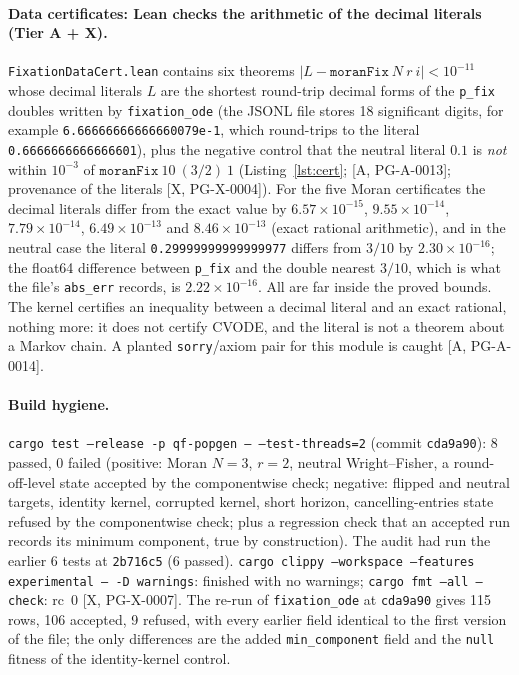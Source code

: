\documentclass[11pt]{article}
\theoremstyle{remark}
\newcommand{\tier}[1]{\textsf{[#1]}}
\newcommand{\lean}[1]{\texttt{#1}}
\begin{document}
\paragraph{Data certificates: Lean checks the arithmetic of the decimal literals (Tier A + X).} \lean{FixationDataCert.lean} contains six theorems
$|L-\texttt{moranFix}\ N\ r\ i|<10^{-11}$ whose decimal literals $L$ are the shortest round-trip decimal forms of the \texttt{p\_fix} doubles written by \lean{fixation\_ode} (the JSONL file stores 18 significant digits, for example \texttt{6.66666666666660079e-1}, which round-trips to the literal \texttt{0.6666666666666601}), plus the negative control
that the neutral literal $0.1$ is \emph{not} within $10^{-3}$ of $\texttt{moranFix}\ 10\ (3/2)\ 1$ (Listing~\ref{lst:cert}; \tier{A, PG-A-0013}; provenance of the literals \tier{X, PG-X-0004}).
For the five Moran certificates the decimal literals differ from the exact value by $6.57\times10^{-15}$, $9.55\times10^{-14}$, $7.79\times10^{-14}$, $6.49\times10^{-13}$ and $8.46\times10^{-13}$ (exact rational arithmetic), and in the neutral case the literal \texttt{0.29999999999999977} differs from $3/10$ by $2.30\times10^{-16}$; the float64 difference between \texttt{p\_fix} and the double nearest $3/10$, which is what the file's \texttt{abs\_err} records, is $2.22\times10^{-16}$. All are far inside the proved bounds. The kernel certifies an inequality between a decimal literal and an exact rational, nothing more: it does not certify CVODE, and the literal is not a theorem about a
Markov chain. A planted \lean{sorry}/axiom pair for this module is caught \tier{A, PG-A-0014}.



\paragraph{Build hygiene.} \texttt{cargo test --release -p qf-popgen -- --test-threads=2} (commit \texttt{cda9a90}): 8 passed, 0 failed (positive: Moran $N=3$, $r=2$, neutral Wright--Fisher, a round-off-level state accepted by the componentwise check; negative: flipped and
neutral targets, identity kernel, corrupted kernel, short horizon, cancelling-entries state refused by the componentwise check; plus a regression check that an accepted run records its minimum component, true by construction). The audit had run the earlier 6 tests at \texttt{2b716c5} (6 passed). \texttt{cargo clippy --workspace --features experimental -- -D warnings}: finished with no warnings;
\texttt{cargo fmt --all --check}: rc~0 \tier{X, PG-X-0007}. The re-run of \lean{fixation\_ode} at \texttt{cda9a90} gives 115 rows, 106 accepted, 9 refused, with every earlier field identical to the first version of the file; the only differences are the added \texttt{min\_component} field and the \texttt{null} fitness of the identity-kernel control.
\end{document}
